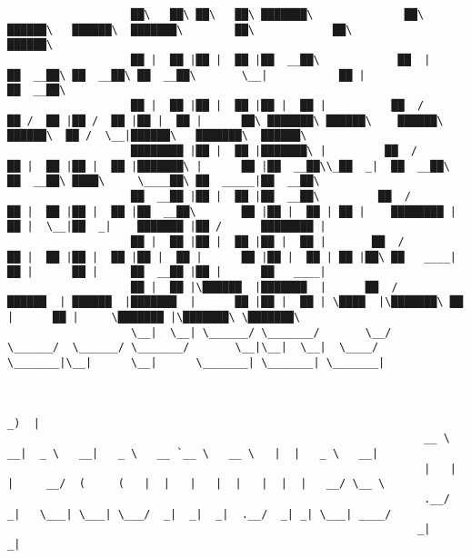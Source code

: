\documentclass[varwidth=\maxdimen,margin=0.5cm,multi={verbatim}]{standalone}
\begin{document}
\begin{verbatim}
                   ██\   ██\ ██\   ██\ ███████\              ██\        ██████\   ██████\  ███████\        ██\            ██\                          ██████\                               
                   ██ |  ██ |██ |  ██ |██  __██\            ██  |      ██  __██\ ██  __██\ ██  __██\       \__|           ██ |                        ██  __██\                              
                   ██ |  ██ |██ |  ██ |██ |  ██ |          ██  /       ██ /  ██ |██ /  ██ |██ |  ██ |      ██\ ███████\ ██████\    ██████\   ██████\  ██ /  \__|██████\   ███████\  ██████\  
                   ████████ |██ |  ██ |███████\ |         ██  /        ██ |  ██ |██ |  ██ |███████\ |      ██ |██  __██\\_██  _|  ██  __██\ ██  __██\ ████\     \____██\ ██  _____|██  __██\ 
                   ██  __██ |██ |  ██ |██  __██\         ██  /         ██ |  ██ |██ |  ██ |██  __██\       ██ |██ |  ██ | ██ |    ████████ |██ |  \__|██  _|    ███████ |██ /      ████████ |
                   ██ |  ██ |██ |  ██ |██ |  ██ |       ██  /          ██ |  ██ |██ |  ██ |██ |  ██ |      ██ |██ |  ██ | ██ |██\ ██   ____|██ |      ██ |     ██  __██ |██ |      ██   ____|
                   ██ |  ██ |\██████  |███████  |      ██  /            ██████  | ██████  |███████  |      ██ |██ |  ██ | \████  |\███████\ ██ |      ██ |     \███████ |\███████\ \███████\ 
                   \__|  \__| \______/ \_______/       \__/             \______/  \______/ \_______/       \__|\__|  \__|  \____/  \_______|\__|      \__|      \_______| \_______| \_______|


                                                                                                                _)  |             
                                                                __ \    __|  _ \   __|   _ \   __ `__ \   __ \   |  |   _ \   __| 
                                                                |   |  |     __/  (     (   |  |   |   |  |   |  |  |   __/ \__ \ 
                                                                .__/  _|   \___| \___| \___/  _|  _|  _|  .__/  _| _| \___| ____/ 
                                                               _|                                        _|


\end{verbatim}
\end{document}
